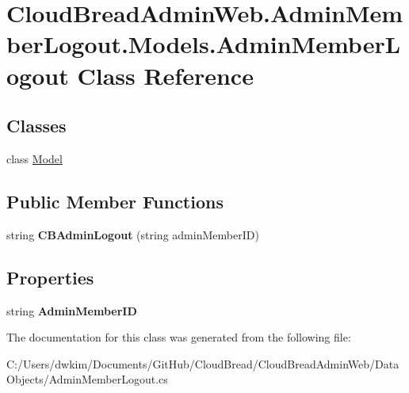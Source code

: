 \hypertarget{class_cloud_bread_admin_web_1_1_admin_member_logout_1_1_models_1_1_admin_member_logout}{}\section{Cloud\+Bread\+Admin\+Web.\+Admin\+Member\+Logout.\+Models.\+Admin\+Member\+Logout Class Reference}
\label{class_cloud_bread_admin_web_1_1_admin_member_logout_1_1_models_1_1_admin_member_logout}
\subsection*{Classes}
\begin{DoxyCompactItemize}
\item 
class \hyperlink{class_cloud_bread_admin_web_1_1_admin_member_logout_1_1_models_1_1_admin_member_logout_1_1_model}{Model}
\end{DoxyCompactItemize}
\subsection*{Public Member Functions}
\begin{DoxyCompactItemize}
\item 
string {\bfseries C\+B\+Admin\+Logout} (string admin\+Member\+ID)\hypertarget{class_cloud_bread_admin_web_1_1_admin_member_logout_1_1_models_1_1_admin_member_logout_a6d6217d3c644febc1d52adb1c66756cc}{}\label{class_cloud_bread_admin_web_1_1_admin_member_logout_1_1_models_1_1_admin_member_logout_a6d6217d3c644febc1d52adb1c66756cc}

\end{DoxyCompactItemize}
\subsection*{Properties}
\begin{DoxyCompactItemize}
\item 
string {\bfseries Admin\+Member\+ID}\hypertarget{class_cloud_bread_admin_web_1_1_admin_member_logout_1_1_models_1_1_admin_member_logout_a58f35da010d962811a25a4ce6b7a34d5}{}\label{class_cloud_bread_admin_web_1_1_admin_member_logout_1_1_models_1_1_admin_member_logout_a58f35da010d962811a25a4ce6b7a34d5}

\end{DoxyCompactItemize}


The documentation for this class was generated from the following file\+:\begin{DoxyCompactItemize}
\item 
C\+:/\+Users/dwkim/\+Documents/\+Git\+Hub/\+Cloud\+Bread/\+Cloud\+Bread\+Admin\+Web/\+Data\+Objects/Admin\+Member\+Logout.\+cs\end{DoxyCompactItemize}
